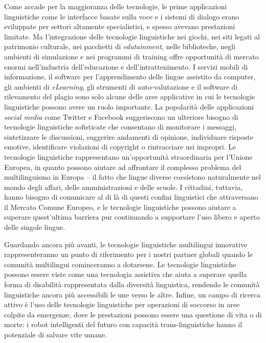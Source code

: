 \begin{multicols}{2}
Come accade per la maggioranza delle tecnologie, le prime applicazioni
linguistiche come le interfacce basate sulla voce e i sistemi di dialogo erano
sviluppate per settori altamente specialistici, e spesso avevano prestazioni
limitate. Ma l'integrazione delle tecnologie linguistiche nei giochi, nei siti
legati al patrimonio culturale, nei pacchetti di \emph{edutainment}, nelle
biblioteche, negli ambienti di simulazione e nei programmi di training offre
opportunit\`{a} di mercato enormi nell'industria dell'educazione e
dell'intrattenimento.  I servizi mobili di informazione, il software per
l'apprendimento delle lingue assistito da computer, gli ambienti di
\emph{eLearning}, gli strumenti di auto-valutazione e il software di
rilevamento del plagio sono solo alcune delle aree applicative in cui le
tecnologie linguistiche possono avere un ruolo importante. La popolarit\`{a}
delle applicazioni \emph{social media} come Twitter e Facebook suggeriscono un
ulteriore bisogno di tecnologie linguistiche sofisticate che consentano di
monitorare i messaggi, sintetizzare le discussioni, suggerire andamenti di
opinione, individuare risposte emotive, identificare violazioni di copyright o
rintracciare usi impropri.
Le tecnologie linguistiche rappresentano un'opportunit\`{a} straordinaria per
l'Unione Europea, in quanto possono aiutare ad affrontare il complesso
problema del multilinguismo in Europa -- il fatto che lingue diverse coesistono
naturalmente nel mondo degli affari, delle amministrazioni e delle scuole. I
cittadini, tuttavia, hanno bisogno di comunicare al di l\`{a} di questi
confini linguistici che attraversano il Mercato Comune Europeo, e le
tecnologie linguistiche possono aiutare a superare quest'ultima barriera pur
continuando a supportare l'uso libero e aperto delle singole lingue. 


Guardando ancora pi\`{u} avanti, le tecnologie linguistiche multilingui innovative
rappresenteranno un punto di riferimento per i nostri partner globali quando le comunit\`{a} multilingui cominceranno a dotarsene. Le tecnologie
linguistiche possono essere viste come una tecnologia assistiva che aiuta a
superare quella forma di disabilit\`{a} rappresentata dalla diversit\`{a}
linguistica, rendendo le comunit\`{a} linguistiche ancora pi\`{u} accessibili
le une verso le altre. Infine, un campo di ricerca attivo \`{e} l'uso delle
tecnologie linguistiche per operazioni di soccorso in aree colpite da
emergenze, dove le prestazioni possono essere una questione di vita o di
morte: i robot intelligenti del futuro con capacit\`{a} trans-linguistiche
hanno il potenziale di salvare vite umane.


\end{multicols}
